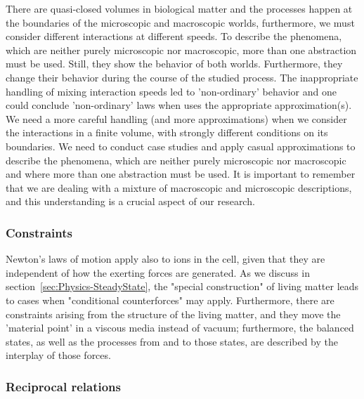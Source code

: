 There are quasi-closed volumes in biological matter and the processes happen at the boundaries of the microscopic and macroscopic worlds, furthermore, we
must consider different interactions at different speeds. To describe
the phenomena, which are neither purely microscopic nor macroscopic, more than one abstraction must be used. Still, they show the behavior
of both worlds. Furthermore, they change their behavior during the
course of the studied process. The inappropriate handling of mixing interaction speeds led to 'non-ordinary' behavior and one could conclude 'non-ordinary' laws when uses the appropriate approximation(s).
We need a more careful handling (and more approximations) when we consider the interactions in a finite volume, with strongly different conditions on its boundaries. 
We need to conduct case studies and apply casual approximations to describe
the phenomena, which are neither purely microscopic nor macroscopic
and where more than one abstraction must be used.
It is important
to remember that we are dealing with a mixture of macroscopic and microscopic
descriptions, and this understanding is a crucial aspect of our research.

\subsubsection{Constraints\label{sec:Physics-ThermoConstraints}}

Newton's laws of motion apply also to ions in the cell, given that 
they are independent of how the exerting forces are generated.
As we discuss in section~\ref{sec:Physics-SteadyState}, the "special construction" of living matter leads to cases when "conditional counterforces" may apply. Furthermore,
there are constraints arising from the structure of the living matter,
and they move the 'material point' in a viscous media instead of vacuum;
furthermore, the balanced states, as well as the processes from and to
those states, are described by the interplay of those forces.


\subsubsection[Reciprocal relations]{Reciprocal relations\label{sec:Physics-ThermodynamicsReciprocal}}

